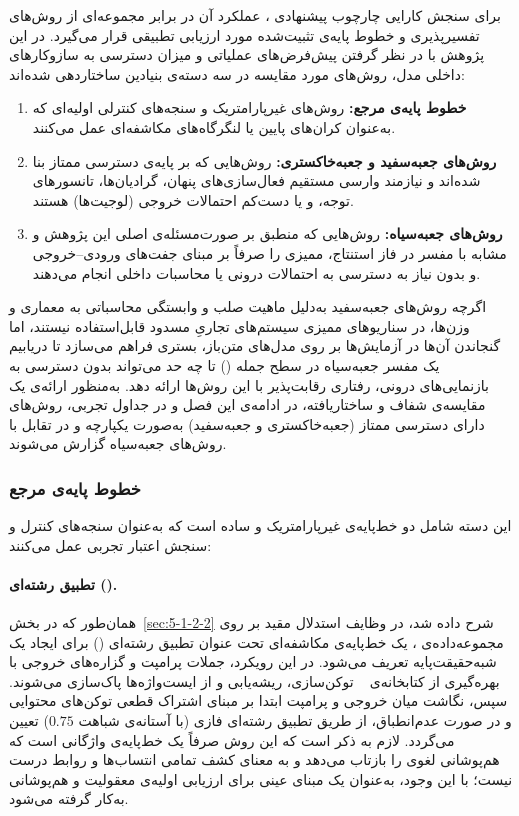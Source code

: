 برای سنجش کارایی چارچوب پیشنهادی ، عملکرد آن در برابر مجموعه‌ای از روش‌های تفسیرپذیری و خطوط پایه‌ی تثبیت‌شده مورد ارزیابی تطبیقی قرار می‌گیرد. در این پژوهش با در نظر گرفتن پیش‌فرض‌های عملیاتی و میزان دسترسی به سازوکارهای داخلی مدل، روش‌های مورد مقایسه در سه دسته‌ی بنیادین ساختاردهی شده‌اند:
\begin{enumerate}
    \item \textbf{خطوط پایه‌ی مرجع:} روش‌های غیرپارامتریک و سنجه‌های کنترلی اولیه‌ای که به‌عنوان کران‌های پایین یا لنگرگاه‌های مکاشفه‌ای عمل می‌کنند.
    \item \textbf{روش‌های جعبه‌سفید و جعبه‌خاکستری:} روش‌هایی که بر پایه‌ی دسترسی ممتاز بنا شده‌اند و نیازمند وارسی مستقیم فعال‌سازی‌های پنهان، گرادیان‌ها، تانسورهای توجه، و یا دست‌کم احتمالات خروجی (لوجیت‌ها) هستند.
    \item \textbf{روش‌های جعبه‌سیاه:} روش‌هایی که منطبق بر صورت‌مسئله‌ی اصلی این پژوهش و مشابه با مفسر  در فاز استنتاج، ممیزی را صرفاً بر مبنای جفت‌های ورودی--خروجی و بدون نیاز به دسترسی به احتمالات درونی یا محاسبات داخلی انجام می‌دهند.
\end{enumerate}

اگرچه روش‌های جعبه‌سفید به‌دلیل ماهیت صلب و وابستگی محاسباتی به معماری و وزن‌ها، در سناریوهای ممیزی سیستم‌های تجاریِ مسدود قابل‌استفاده نیستند، اما گنجاندن آن‌ها در آزمایش‌ها بر روی مدل‌های متن‌باز، بستری فراهم می‌سازد تا دریابیم یک مفسر جعبه‌سیاه در سطح جمله () تا چه حد می‌تواند بدون دسترسی به بازنمایی‌های درونی، رفتاری رقابت‌پذیر با این روش‌ها ارائه دهد. به‌منظور ارائه‌ی یک مقایسه‌ی شفاف و ساختاریافته، در ادامه‌ی این فصل و در جداول تجربی، روش‌های دارای دسترسی ممتاز (جعبه‌خاکستری و جعبه‌سفید) به‌صورت یکپارچه و در تقابل با روش‌های جعبه‌سیاه گزارش می‌شوند.


\subsubsection{خطوط پایه‌ی مرجع}\label{sec:5-1-3-1}

این دسته شامل دو خط‌پایه‌ی غیرپارامتریک و ساده است که به‌عنوان سنجه‌های کنترل و سنجش اعتبار تجربی عمل می‌کنند:

\paragraph{تطبیق رشته‌ای ().}\label{par:chap5_stringmatching_baseline}
همان‌طور که در بخش~\ref{sec:5-1-2-2} شرح داده شد، در وظایف استدلال مقید بر روی مجموعه‌داده‌ی ، یک خط‌پایه‌ی مکاشفه‌ای تحت عنوان تطبیق رشته‌ای () برای ایجاد یک شبه‌حقیقت‌پایه تعریف می‌شود. در این رویکرد، جملات پرامپت و گزاره‌های خروجی با بهره‌گیری از کتابخانه‌ی ~\cite{honnibal2017spacy} توکن‌سازی، ریشه‌یابی و از ایست‌واژه‌ها پاک‌سازی می‌شوند. سپس، نگاشت میان خروجی و پرامپت ابتدا بر مبنای اشتراک قطعی توکن‌های محتوایی و در صورت عدم‌انطباق، از طریق تطبیق رشته‌ای فازی (با آستانه‌ی شباهت $0.75$) تعیین می‌گردد. لازم به ذکر است که این روش صرفاً یک خط‌پایه‌ی واژگانی است که هم‌پوشانی لغوی را بازتاب می‌دهد و به معنای کشف تمامی انتساب‌ها و روابط درست نیست؛ با این وجود، به‌عنوان یک مبنای عینی برای ارزیابی اولیه‌ی معقولیت و هم‌پوشانی به‌کار گرفته می‌شود.

